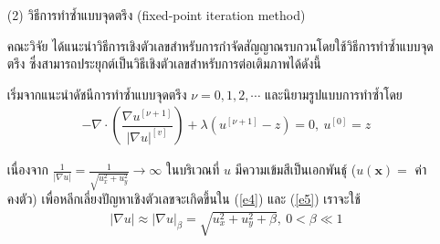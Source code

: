 \documentclass[hidelinks, a4paper,12pt]{article}
\numberwithin{equation}{section}							%
\numberwithin{equation}{section}
\begin{document}
{\begin{itemize}
	 \vspace{0.5cm} \hspace{0.5cm}วิธีเดินเวลาแบบชัดแจ้งสำหรับภาพเฉดเทามีขั้นตอนวิธีดังนี้  \\
	 \vspace{0.5cm} 
	\begin{algorithm}[H]
		\caption{ETM Method for TV-based Image Inpainting}		
		\SetAlgoNoLine 
	\end{algorithm}
	
	 \item[(2)] วิธีการทำซ้ำแบบจุดตรึง (fixed-point iteration method) 
	 
	 \hspace{1cm} คณะวิจัย \cite{ref:FixpointSolver} ได้แนะนำวิธีการเชิงตัวเลขสำหรับการกำจัดสัญญาณรบกวนโดยใช้วิธีการทำซ้ำแบบจุดตรึง ซึ่งสามารถประยุกต์เป็นวิธีเชิงตัวเลขสำหรับการต่อเติมภาพได้ดังนี้
	
	\hspace{1cm} เริ่มจากแนะนำดัชนีการทำซ้ำแบบจุดตรึง $\nu=0,1,2,\cdots$ และนิยามรูปแบบการทำซ้ำโดย
	\begin{align}
	- \nabla\cdot\left(\dfrac{\nabla u^{[\nu+1]}}{{| \nabla u |}^{[v]} }\right) + \lambda(u^{[\nu+1]}-z)  = 0,\ u^{[0]}=z
	\label{e5}
	\end{align}

\hspace{1cm} เนื่องจาก $\tfrac{1}{| \nabla u |}=\tfrac{1}{\sqrt{u_x^2+u_y^2}} \rightarrow \infty$ ในบริเวณที่ $u$ มีความเข้มสีเป็นเอกพันธ์ุ ($u(\mathbf{x})=$ ค่าคงตัว) เพื่อหลีกเลี่ยงปัญหาเชิงตัวเลขจะเกิดขึ้นใน (\ref{e4}) และ (\ref{e5}) เราจะใช้ 
\begin{align*}
|\nabla u| \approx| \nabla u |_\beta=\sqrt{u_x^2+u_y^2+\beta},\ 0< \beta \ll 1
 \end{align*}


\end{itemize}}
\end{document}
